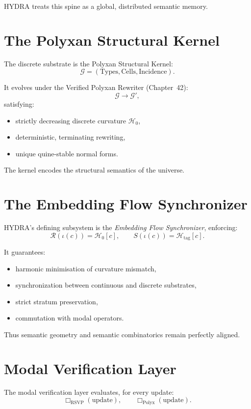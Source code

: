 HYDRA treats this spine as a global, distributed semantic memory.

\section{The Polyxan Structural Kernel}

The discrete substrate is the Polyxan Structural Kernel:
\[
\mathcal{G} = (\mathrm{Types}, \mathrm{Cells}, \mathrm{Incidence}).
\]

It evolves under the Verified Polyxan Rewriter (Chapter~42):
\[
\mathcal{G} \longrightarrow \mathcal{G}',
\]
satisfying:
\begin{itemize}
\item strictly decreasing discrete curvature $\mathcal{H}_0$,
\item deterministic, terminating rewriting,
\item unique quine-stable normal forms.
\end{itemize}

The kernel encodes the structural semantics of the universe.

\section{The Embedding Flow Synchronizer}

HYDRA’s defining subsystem is the \emph{Embedding Flow Synchronizer}, enforcing:
\[
\mathcal{R}(\iota(c)) = \mathcal{H}_0[c], \qquad 
S(\iota(c)) = \mathcal{H}_{\mathrm{tag}}[c].
\]

It guarantees:
\begin{itemize}
\item harmonic minimisation of curvature mismatch,
\item synchronization between continuous and discrete substrates,
\item strict stratum preservation,
\item commutation with modal operators.
\end{itemize}

Thus semantic geometry and semantic combinatorics remain perfectly aligned.

\section{Modal Verification Layer}

The modal verification layer evaluates, for every update:
\[
\Box_{\mathrm{RSVP}}(\text{update}), \qquad 
\Box_{\mathrm{Polyx}}(\text{update}).
\]

